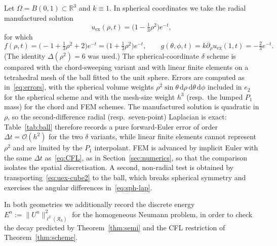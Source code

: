 \documentclass[final,3p,times]{elsarticle}
\theoremstyle{plain}
\theoremstyle{definition}
\theoremstyle{remark}
\newcommand{\dziti}{\ensuremath{\delta}\text{-Ziti}}
\newcommand{\dd}{\mathrm{d}}
\begin{document}
Let $\Omega=B(0,1)\subset\mathbb{R}^3$ and $k\equiv 1$. In spherical
coordinates we take the radial manufactured solution
\begin{equation}
\label{eq:uex-ball}
u_{\mathrm{ex}}(\rho,t)
=\bigl(1-\tfrac13\rho^2\bigr)e^{-t},
\end{equation}
for which
\begin{equation}
\label{eq:fg-ball}
f(\rho,t)
=\bigl(-1+\tfrac13\rho^2+2\bigr)e^{-t}
=\bigl(1+\tfrac13\rho^2\bigr)e^{-t},
\qquad
g(\theta,\phi,t)
=k\partial_\rho u_{\mathrm{ex}}(1,t)
=-\tfrac23 e^{-t}.
\end{equation}
(The identity $\Delta(\rho^2)=6$ was used.) The spherical-coordinate
\dziti{} scheme is compared with the chord-sweeping variant and with linear
finite elements on a tetrahedral mesh of the ball fitted to the unit sphere.
Errors are computed as in~\eqref{eq:errors}, with the spherical volume
weights $\rho^2\sin\theta\,\dd\rho\,\dd\theta\,\dd\phi$ included in $e_2$
for the spherical scheme and with the mesh-size weight $h^3$ (resp.\ the
lumped $P_1$ mass) for the chord and FEM schemes. The manufactured solution
is quadratic in $\rho$, so the second-difference radial (resp.\ seven-point)
Laplacian is exact: Table~\ref{tab:ball} therefore records a pure
forward-Euler error of order $\Delta t=\mathcal{O}(h^2)$ for the two
\dziti{} variants, while linear finite elements cannot represent
$\rho^2$ and are limited by the $P_1$ interpolant. FEM is advanced by
implicit Euler with the same $\Delta t$ as~\eqref{eq:CFL}, as in
Section~\ref{sec:numerics}, so that the comparison isolates the spatial
discretisation. A second, non-radial test is obtained by
transporting~\eqref{eq:uex-cube2}
to the ball, which breaks spherical symmetry and exercises the angular
differences in~\eqref{eq:sph-lap}.

In both geometries we additionally record the discrete energy
$E^n:=\lVert U^n\rVert_{\ell^2(\mathcal{R}_h)}^2$ for the homogeneous
Neumann problem, in order to check the decay predicted by
Theorem~\ref{thm:semi} and the CFL restriction of Theorem~\ref{thm:scheme}.
\end{document}

